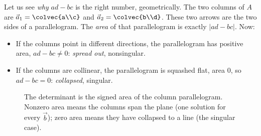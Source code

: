 Let us see \emph{why} $ad-bc$ is the right number, geometrically. The two
columns of $A$ are $\vec a_1=\colvec{a\\c}$ and $\vec a_2=\colvec{b\\d}$.
These two arrows are the two sides of a parallelogram. The
\emph{area} of that parallelogram is exactly $\lvert ad-bc\rvert$. Now:
\begin{itemize}
  \item If the columns point in different directions, the parallelogram has
  positive area, $ad-bc\neq0$: \emph{spread out}, nonsingular.
  \item If the columns are collinear, the parallelogram is squashed flat,
  area $0$, so $ad-bc=0$: \emph{collapsed}, singular.
\end{itemize}

\begin{figure}[H]
\centering
{}
\caption{The determinant is the signed area of the column parallelogram.
Nonzero area means the columns span the plane (one solution for every
$\vec b$); zero area means they have collapsed to a line (the singular
case).}
\label{ch06:detarea}
\end{figure}


